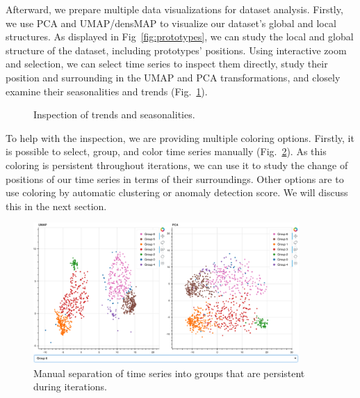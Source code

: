 Afterward, we prepare multiple data visualizations for dataset analysis. Firstly, we use PCA and UMAP/densMAP to visualize our dataset's global and local structures. As displayed in Fig~\ref{fig:prototypes}, we can study the local and global structure of the dataset, including prototypes' positions. Using interactive zoom and selection, we can select time series to inspect them directly, study their position and surrounding in the UMAP and PCA transformations, and closely examine their seasonalities and trends (Fig.~\ref{fig:selected-seasonalities}).
\begin{figure}[htp]
    \centering
    
    \caption{Inspection of trends and seasonalities.}
    \label{fig:selected-seasonalities}
\end{figure}

To help with the inspection, we are providing multiple coloring options. Firstly, it is possible to select, group, and color time series manually (Fig.~\ref{fig:coloring}). As this coloring is persistent throughout iterations, we can use it to study the change of positions of our time series in terms of their surroundings. Other options are to use coloring by automatic clustering or anomaly detection score. We will discuss this in the next section.
\begin{figure}[htp]
    \centering
    \includegraphics[width=0.9\textwidth]{img/overview.png}
    \caption{Manual separation of time series into groups that are persistent during iterations.}
    \label{fig:coloring}
\end{figure}

